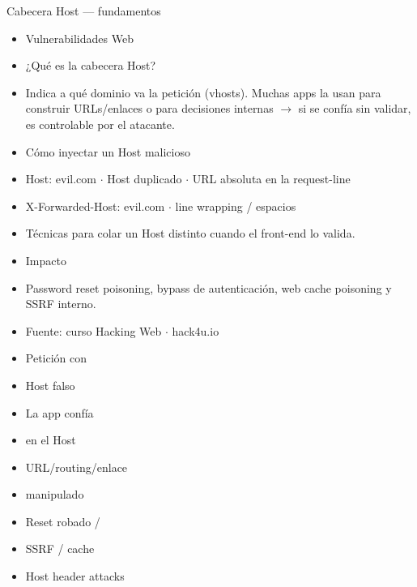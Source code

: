 \documentclass[aspectratio=169,10pt]{beamer}
\begin{document}
\begin{frame}[allowframebreaks]{Cabecera Host --- fundamentos}
\small
  \begin{itemize}
  \item Vulnerabilidades Web
  \item ¿Qué es la cabecera Host?
  \item Indica a qué dominio va la petición (vhosts). Muchas apps la usan para construir URLs/enlaces o para decisiones internas $\rightarrow$ si se confía sin validar, es controlable por el atacante.
  \item Cómo inyectar un Host malicioso
  \item Host: evil.com $\cdot$ Host duplicado $\cdot$ URL absoluta en la request-line
  \item X-Forwarded-Host: evil.com $\cdot$ line wrapping / espacios
  \item Técnicas para colar un Host distinto cuando el front-end lo valida.
  \item Impacto
  \item Password reset poisoning, bypass de autenticación, web cache poisoning y SSRF interno.
  \item Fuente: curso Hacking Web $\cdot$ hack4u.io
  \item Petición con
  \item Host falso
  \item La app confía
  \item en el Host
  \item URL/routing/enlace
  \item manipulado
  \item Reset robado /
  \item SSRF / cache
  \item Host header attacks
  \end{itemize}
\end{frame}
\end{document}
